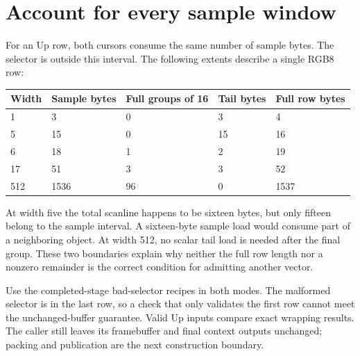\section{Account for every sample window}
For an Up row, both cursors consume the same number of sample bytes. The selector
is outside this interval. The following extents describe a single RGB8 row:
\begin{longtable}{p{20mm}p{30mm}p{30mm}p{30mm}p{30mm}}
\toprule Width & Sample bytes & Full groups of 16 & Tail bytes & Full row bytes \\\midrule
1 & 3 & 0 & 3 & 4 \\
5 & 15 & 0 & 15 & 16 \\
6 & 18 & 1 & 2 & 19 \\
17 & 51 & 3 & 3 & 52 \\
512 & 1536 & 96 & 0 & 1537 \\\bottomrule
\end{longtable}
At width five the total scanline happens to be sixteen bytes, but only fifteen
belong to the sample interval. A sixteen-byte sample load would consume part of a
neighboring object. At width 512, no scalar tail load is needed after the final group.
These two boundaries explain why neither the full row length nor a nonzero remainder
is the correct condition for admitting another vector.

Use the completed-stage bad-selector recipes in both modes. The malformed selector
is in the last row, so a check that only validates the first row cannot meet the
unchanged-buffer guarantee. Valid Up inputs compare exact wrapping results. The
caller still leaves its framebuffer and final context outputs unchanged; packing
and publication are the next construction boundary.
